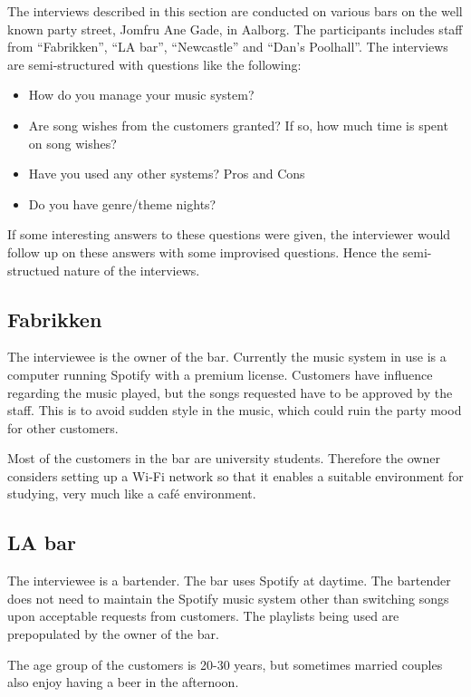 The interviews described in this section are conducted on various bars on the well known party street, Jomfru Ane Gade, in Aalborg. The participants includes staff from \enquote{Fabrikken}, \enquote{LA bar}, \enquote{Newcastle} and \enquote{Dan's Poolhall}. The interviews are semi-structured with questions like the following:

\begin{itemize}
  \item How do you manage your music system?
  \item Are song wishes from the customers granted? If so, how much time is spent on song wishes?
  \item Have you used any other systems? Pros and Cons
  \item Do you have genre/theme nights?
\end{itemize}

If some interesting answers to these questions were given, the interviewer would follow up on these answers with some improvised questions. Hence the semi-structued nature of the interviews.

\subsection{Fabrikken}
\label{sub:fabrikken}

The interviewee is the owner of the bar. Currently the music system in use is a computer running Spotify with a premium license. Customers have influence regarding the music played, but the songs requested have to be approved by the staff. This is to avoid sudden style in the music, which could ruin the party mood for other customers.

Most of the customers in the bar are university students. Therefore the owner considers setting up a Wi-Fi network so that it enables a suitable environment for studying, very much like a café environment.

\subsection{LA bar}
\label{sub:la_bar}

The interviewee is a bartender. The bar uses Spotify at daytime. The bartender does not need to maintain the Spotify music system other than switching songs upon acceptable requests from customers. The playlists being used are prepopulated by the owner of the bar.

The age group of the customers is 20-30 years, but sometimes married couples also enjoy having a beer in the afternoon.

